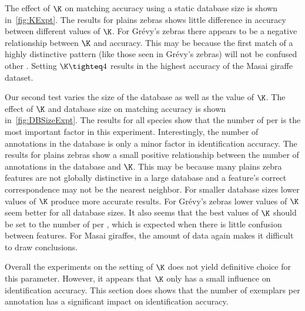         The effect of $\K$ on matching accuracy using a static database size is shown in~\cref{fig:KExpt}.
        The results for plains zebras shows little difference in accuracy between different values of $\K$.
        For Grévy's zebras there appears to be a negative relationship between $\K$ and accuracy.
        This may be because the first match of a highly distinctive pattern (like those seen in Grévy's zebras)
          will not be confused other \names{}.
        Setting $\K\tighteq4$ results in the highest accuracy of the Masai giraffe dataset.

        \KExpt{}
        
        Our second test varies the size of the database as well as the value of $\K$.
        The effect of $\K$ and database size on matching accuracy is shown in~\cref{fig:DBSizeExpt}.
        The results for all species show that the number of \exemplars{} per \name{} is the most important factor
          in this experiment.
        Interestingly, the number of annotations in the database is only a minor factor in identification
          accuracy.
        The results for plains zebras show a small positive relationship between the number of annotations in the
          database and $\K$.
        This may be because many plains zebra features are not globally distinctive in a large database and a
          feature's correct correspondence may not be the nearest neighbor.
        For smaller database sizes lower values of $\K$ produce more accurate results.
        For Grévy's zebras lower values of $\K$ seem better for all database sizes.
        It also seems that the best values of $\K$ should be set to the number of \exemplars{} per \name{}, which
          is expected when there is little confusion between features.
        For Masai giraffes, the amount of data again makes it difficult to draw conclusions.

        \DBSizeExpt{}

        Overall the experiments on the setting of $\K$ does not yield definitive choice for this parameter.
        However, it appears that $\K$ only has a small influence on identification accuracy.
        This section does shows that the number of exemplars per annotation has a significant impact on
          identification accuracy.

